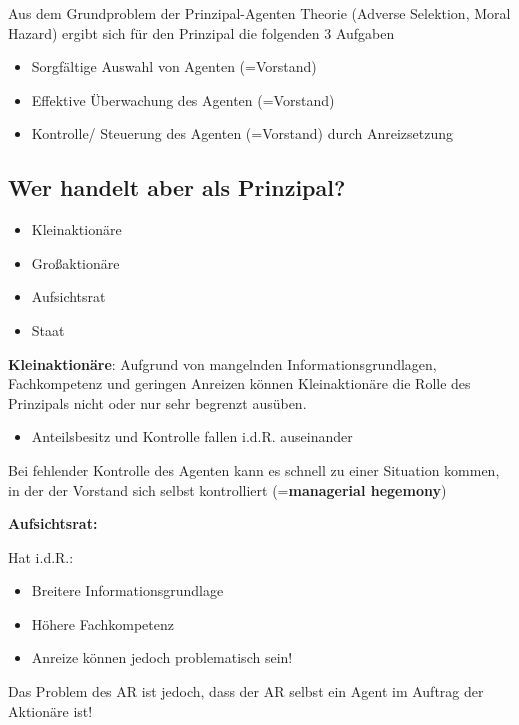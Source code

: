 \documentclass[
]{article}
\providecommand{\tightlist}{%
  \setlength{\itemsep}{0pt}\setlength{\parskip}{0pt}}
\begin{document}
Aus dem Grundproblem der Prinzipal-Agenten Theorie (Adverse Selektion,
Moral Hazard) ergibt sich für den Prinzipal die folgenden 3 Aufgaben

\begin{itemize}
\tightlist
\item
  Sorgfältige Auswahl von Agenten (=Vorstand)
\item
  Effektive Überwachung des Agenten (=Vorstand)
\item
  Kontrolle/ Steuerung des Agenten (=Vorstand) durch Anreizsetzung
\end{itemize}

\hypertarget{wer-handelt-aber-als-prinzipal}{%
\subsection{Wer handelt aber als
Prinzipal?}\label{wer-handelt-aber-als-prinzipal}}

\begin{itemize}
\tightlist
\item
  Kleinaktionäre
\item
  Großaktionäre
\item
  Aufsichtsrat
\item
  Staat
\end{itemize}

\textbf{Kleinaktionäre}: Aufgrund von mangelnden Informationsgrundlagen,
Fachkompetenz und geringen Anreizen können Kleinaktionäre die Rolle des
Prinzipals nicht oder nur sehr begrenzt ausüben.

\begin{itemize}
\tightlist
\item
  Anteilsbesitz und Kontrolle fallen i.d.R. auseinander
\end{itemize}

Bei fehlender Kontrolle des Agenten kann es schnell zu einer Situation
kommen, in der der Vorstand sich selbst kontrolliert
(=\textbf{managerial hegemony})

\textbf{Aufsichtsrat:}

Hat i.d.R.:

\begin{itemize}
\tightlist
\item
  Breitere Informationsgrundlage
\item
  Höhere Fachkompetenz
\item
  Anreize können jedoch problematisch sein!
\end{itemize}

Das Problem des AR ist jedoch, dass der AR selbst ein Agent im Auftrag
der Aktionäre ist!
\end{document}
